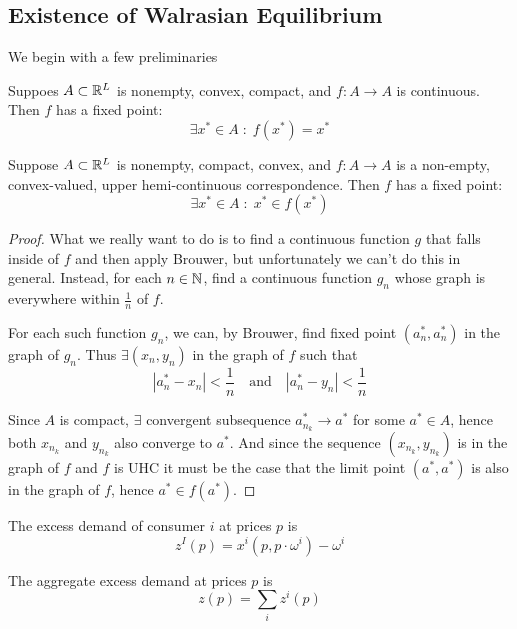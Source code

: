 

\subsection{Existence of Walrasian Equilibrium}
\label{sec:exist-walr-equil}

We begin with a few preliminaries

\begin{theorem}
  Suppoes $A \subset {\mathbb R}^L$ is nonempty, convex, compact, and $f: A \to
  A$ is continuous. Then $f$ has a fixed point:
  \[
  \exists x^* \in A \; : \; f(x^*) = x^*
  \]
\end{theorem}

\begin{theorem}
  Suppose $A \subset {\mathbb R}^L$ is nonempty, compact, convex, and $f : A
  \to A$ is a non-empty, convex-valued, upper hemi-continuous
  correspondence. Then $f$ has a fixed point:
  \[
  \exists x^* \in A \; : \; x^* \in f(x^*)
  \]
\end{theorem}

\begin{proof}
  What we really want to do is to find a continuous function $g$ that
  falls inside of $f$ and then apply Brouwer, but unfortunately we
  can't do this in general. Instead, for each $n \in {\mathbb N}$, find a
  continuous function $g_n$ whose graph is everywhere within
  $\frac{1}{n}$ of $f$. 

  For each such function $g_n$, we can, by Brouwer, find fixed point
  $(a_n^*, a_n^*)$ in the graph of $g_n$. Thus $\exists (x_n, y_n)$ in
  the graph of $f$ such that
  \[
  |a_n^* - x_n| < \frac{1}{n} \quad \text{and} \quad |a_n^* - y_n| < \frac{1}{n}
  \]

  Since $A$ is compact, $\exists$ convergent subsequence $a^*_{n_k}
  \to a^*$ for some $a^* \in A$, hence both $x_{n_k}$ and $y_{n_k}$
  also converge to $a^*$. And since the sequence $(x_{n_k}, y_{n_k})$
  is in the graph of $f$ and $f$ is UHC it must be the case that the
  limit point $(a^*, a^*)$ is also in the graph of $f$, hence $a^* \in
  f(a^*)$.
\end{proof}


\begin{definition}
  The excess demand of consumer $i$ at prices $p$ is
  \[
  z^I(p) = x^i(p, p \cdot \omega^i) - \omega^i
  \]
\end{definition}

\begin{definition}
  The aggregate excess demand at prices $p$ is
  \[
  z(p) = \sum_i z^i(p)
  \]
\end{definition}

